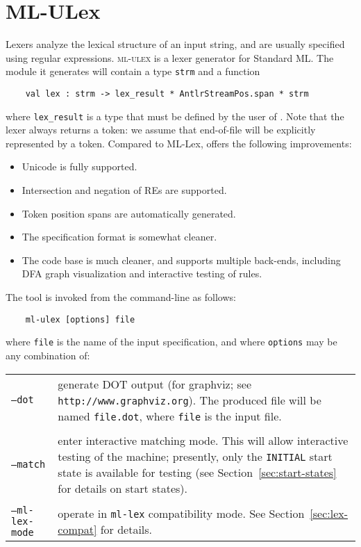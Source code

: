 \chapter{ML-ULex}


Lexers analyze the lexical structure of an input string, and are usually specified using regular expressions.  \textsc{ml-ulex} is a lexer generator for Standard ML.  The module it generates will contain a type {\tt strm} and a function
\begin{verbatim}
    val lex : strm -> lex_result * AntlrStreamPos.span * strm
\end{verbatim}
where {\tt lex\_result} is a type that must be defined by the user of \ulex{}.  Note that the lexer always returns a token: we assume that end-of-file will be explicitly represented by a token.  Compared to ML-Lex, \ulex{} offers the following improvements:
\begin{itemize}
 \item Unicode is fully supported.
 \item Intersection and negation of REs are supported.
 \item Token position spans are automatically generated.
 \item The specification format is somewhat cleaner.
 \item The code base is much cleaner, and supports multiple back-ends, including DFA graph visualization and interactive testing of rules.
\end{itemize}
The tool is invoked from the command-line as follows:
\begin{verbatim}
    ml-ulex [options] file
\end{verbatim}
where {\tt file} is the name of the input \ulex{} specification, and where {\tt options} may be any combination of:

\vskip 12pt
\begin{tabular}{lp{}}
  {\tt --dot} & generate DOT output (for graphviz; see \texttt{http://www.graphviz.org}).  The produced file will be named {\tt file.dot}, where {\tt file} is the input file. \\
  \\
  {\tt --match} & enter interactive matching mode.  This will allow interactive testing of the machine; presently, only the {\tt INITIAL} start state is available for testing (see Section~\ref{sec:start-states} for details on start states).  \\
  \\
  {\tt --ml-lex-mode} & operate in {\tt ml-lex} compatibility mode.  See Section~\ref{sec:lex-compat} for details.
\end{tabular}

